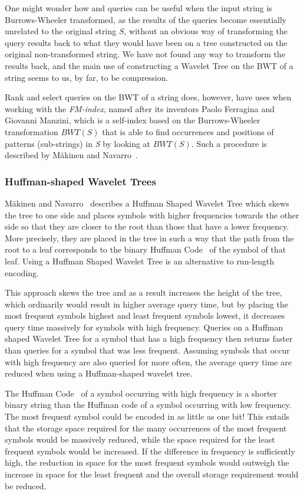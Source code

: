 One might wonder how  and  queries can be useful when the input string is Burrows-Wheeler transformed, as the results of the queries become essentially unrelated to the original string $S$, without an obvious way of transforming the query results back to what they would have been on a tree constructed on the original non-transformed string.
We have not found any way to transform the results back, and the main use of constructing a Wavelet Tree on the BWT of a string seems to us, by far, to be compression.

Rank and select queries on the BWT of a string does, however, have uses when working with the \textit{FM-index}, named after its inventors Paolo Ferragina and Giovanni Manzini, which is a self-index based on the Burrows-Wheeler transformation $BWT(S)$ that is able to find occurrences and positions of patterns (sub-strings) in \textit{S} by looking at $BWT(S)$. 
Such a procedure is described by Mäkinen and Navarro~.

\subsubsection{Huffman-shaped Wavelet Trees}
\label{sec:huffmanShapedWaveletTree}
Mäkinen and Navarro~ describes a Huffman Shaped Wavelet Tree which skews the tree to one side and places symbols with higher frequencies towards the other side so that they are closer to the root than those that have a lower frequency.
More precisely, they are placed in the tree in such a way that the path from the root to a leaf corresponds to the binary Huffman Code~ of the symbol of that leaf.
Using a Huffman Shaped Wavelet Tree is an alternative to run-length encoding.

This approach skews the tree and as a result increases the height of the tree, which ordinarily would result in higher average query time, but by placing the most frequent symbols highest and least frequent symbols lowest, it decreases query time massively for symbols with high frequency.
Queries on a Huffman shaped Wavelet Tree for a symbol that has a high frequency then returns faster than queries for a symbol that was less frequent.
Assuming symbols that occur with high frequency are also queried for more often, the average query time are reduced when using a Huffman-shaped wavelet tree.

The Huffman Code~ of a symbol occurring with high frequency is a shorter binary string than the Huffman code of a symbol occurring with low frequency.
The most frequent symbol could be encoded in as little as one bit!
This entails that the storage space required for the many occurrences of the most frequent symbols would be massively reduced, while the space required for the least frequent symbols would be increased.
If the difference in frequency is sufficiently high, the reduction in space for the most frequent symbols would outweigh the increase in space for the least frequent and the overall storage requirement would be reduced.

